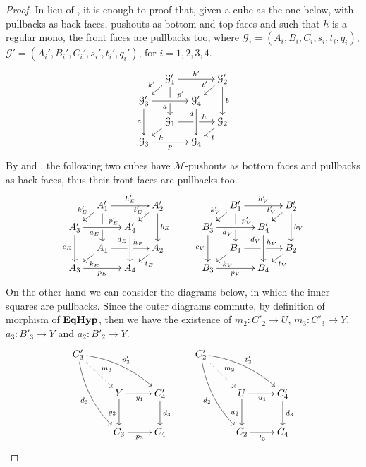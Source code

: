 \begin{proof}
	In lieu of , it is enough to proof that, given a cube as the one below, with pullbacks as back faces, pushouts as bottom and top faces and such that $h$ is a regular mono,
	the front faces are pullbacks too, where $\mathcal{G}_i = (A_i, B_i, C_i, s_i, t_i, q_i)$, $\mathcal{G}'=(A_i', B_i', C_i', s_i', t_i', q_i')$, for $i = 1, 2, 3, 4$.
  	\[
	\xymatrix@C=10pt@R=6pt{&\mathcal{G}_1'\ar[dd]|\hole_(.65){a}\ar[rr]^{h'} \ar[dl]_{k'} && \mathcal{G}_2' \ar[dd]^{b} \ar[dl]_{t'} \\ \mathcal{G}_3'  \ar[dd]_{c}\ar[rr]^(.7){p'} & & \mathcal{G}_4' \ar[dd]_(.3){d}\\&\mathcal{G}_1\ar[rr]|\hole^(.65){h} \ar[dl]^{k} && \mathcal{G}_2 \ar[dl]^{t} \\\mathcal{G}_3 \ar[rr]_{p} & & \mathcal{G}_4 }
	\]
	By  and , the following two cubes have $\mathcal{M}$-pushouts as bottom faces and pullbacks as back faces,
	thus their front faces are pullbacks too.
	\[
        \xymatrix@C=10pt@R=6pt{&A_1'\ar[dd]|\hole_(.65){a_E}\ar[rr]^{h_E'} \ar[dl]_{k_E'} && A_2' \ar[dd]^{b_E} \ar[dl]_{t_E'} \\ A_3'  \ar[dd]_{c_E}\ar[rr]^(.7){p_E'} & & A_4' \ar[dd]_(.3){d_E}\\&A_1\ar[rr]|\hole^(.65){h_E} \ar[dl]^{k_E} && A_2 \ar[dl]^{t_E} \\A_3 \ar[rr]_{p_E} & & A_4 }
	\qquad
        \xymatrix@C=10pt@R=6pt{&B_1'\ar[dd]|\hole_(.65){a_V}\ar[rr]^{h_V'} \ar[dl]_{k_V'} && B_2' \ar[dd]^{b_V} \ar[dl]_{t_V'} \\ B_3'  \ar[dd]_{c_V}\ar[rr]^(.7){p_V'} & & B_4' \ar[dd]_(.3){d_V}\\&B_1\ar[rr]|\hole^(.65){h_V} \ar[dl]^{k_V} && B_2 \ar[dl]^{t_V} \\B_3 \ar[rr]_{p_V} & & B_4 }
	\]
	On the other hand we can consider the diagrams below, in which the inner squares are pullbacks.
	Since the outer diagrams commute, by definition of morphism of $\textbf{\textup{EqHyp}}$, then we have the existence of $m_2\colon C'_2\to U$, $m_3\colon C'_3\to Y $, $a_3\colon B'_3\to Y$ and $a_2\colon B'_2\to Y$.
	\[\xymatrix{C'_3 \ar@{.>}[dr]^{m_3} \ar@/^.3cm/[drr]^{p'_3} \ar@/_.3cm/[ddr]_{d_3} &&& C'_2 \ar@{.>}[dr]^{m_2} \ar@/^.3cm/[drr]^{t'_3} \ar@/_.3cm/[ddr]_{d_2}\\&Y \ar[r]_{y_1} \ar[d]_{y_2}& C'_4\ar[d]^{d_3}&& U \ar[d]_{u_2}\ar[r]_{u_1}& C'_4 \ar[d]^{d_3}\\&C_3 \ar[r]_{p_3}& C_4 &&C_2 \ar[r]_{t_3}& C_4 }\]


\end{proof}

